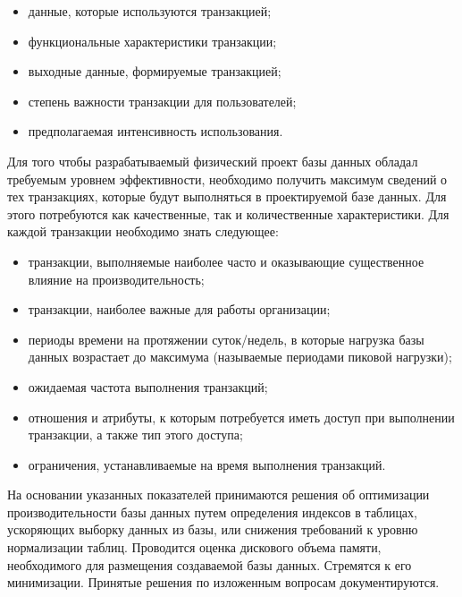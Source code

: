\begin{enumerate}
        \begin{itemize}
        	\item данные, которые используются транзакцией;
        
        	\item функциональные характеристики транзакции;
        
        	\item выходные данные, формируемые транзакцией;
        
        	\item степень важности транзакции для пользователей;
        
        	\item предполагаемая интенсивность использования. 
        \end{itemize}
        	
        Для того чтобы разрабатываемый физический проект базы данных
        обладал требуемым уровнем эффективности, необходимо получить
        максимум сведений о тех транзакциях, которые будут выполняться в
        проектируемой базе данных. Для этого потребуются как качественные, так и
        количественные характеристики. Для каждой транзакции необходимо знать
        следующее:
        
        \begin{itemize}
        	\item транзакции, выполняемые наиболее часто и оказывающие
        	существенное влияние на производительность;
        
        	\item транзакции, наиболее важные для работы организации;
        
        	\item периоды времени на протяжении суток/недель, в которые нагрузка
       		базы данных возрастает до максимума (называемые периодами пиковой
        	нагрузки);
        
        	\item ожидаемая частота выполнения транзакций;
        
        	\item отношения и атрибуты, к которым потребуется иметь доступ при
       		выполнении транзакции, а также тип этого доступа;
        
        	\item ограничения, устанавливаемые на время выполнения транзакций.
        \end{itemize} 
        
        На основании указанных показателей принимаются решения об оптимизации производительности базы данных путем определения индексов
        в таблицах, ускоряющих выборку данных из базы, или снижения требований к уровню нормализации таблиц.
        Проводится оценка дискового объема памяти, необходимого для размещения создаваемой базы данных.
        Стремятся к его минимизации. Принятые решения по изложенным вопросам документируются.
        

\end{enumerate}
